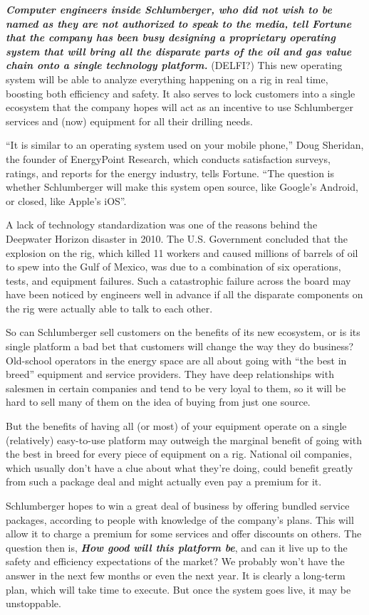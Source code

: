 \documentclass[12pt,a4paper]{article}
\begin{document}
\textbf{\emph{Computer engineers inside Schlumberger, who did not wish to be
    named as they are not authorized to speak to the media, tell Fortune
    that the company has been busy designing a proprietary operating system
    that will bring all the disparate parts of the oil and gas value chain
    onto a single technology platform.}} (DELFI?) This new operating system
will be able to analyze everything happening on a rig in real time, boosting
both efficiency and safety. It also serves to lock customers into a single
ecosystem that the company hopes will act as an incentive to use
Schlumberger services and (now) equipment for all their drilling needs.

``It is similar to an operating system used on your mobile phone,'' Doug
Sheridan, the founder of EnergyPoint Research, which conducts satisfaction
surveys, ratings, and reports for the energy industry, tells Fortune. ``The
question is whether Schlumberger will make this system open source, like
Google's Android, or closed, like Apple's iOS''.

A lack of technology standardization was one of the reasons behind the
Deepwater Horizon disaster in 2010. The U.S. Government concluded that the
explosion on the rig, which killed 11 workers and caused millions of barrels
of oil to spew into the Gulf of Mexico, was due to a combination of six
operations, tests, and equipment failures. Such a catastrophic failure
across the board may have been noticed by engineers well in advance if all
the disparate components on the rig were actually able to talk to each
other.

So can Schlumberger sell customers on the benefits of its new ecosystem, or
is its single platform a bad bet that customers will change the way they do
business? Old-school operators in the energy space are all about going with
``the best in breed'' equipment and service providers. They have deep
relationships with salesmen in certain companies and tend to be very loyal
to them, so it will be hard to sell many of them on the idea of buying from
just one source.

But the benefits of having all (or most) of your equipment operate on a
single (relatively) easy-to-use platform may outweigh the marginal benefit
of going with the best in breed for every piece of equipment on a rig.
National oil companies, which usually don't have a clue about what they're
doing, could benefit greatly from such a package deal and might actually
even pay a premium for it.

Schlumberger hopes to win a great deal of business by offering bundled
service packages, according to people with knowledge of the company's plans.
This will allow it to charge a premium for some services and offer discounts
on others. The question then is, \textbf{\emph{How good will this platform
    be}}, and can it live up to the safety and efficiency expectations of
the market? We probably won't have the answer in the next few months or even
the next year. It is clearly a long-term plan, which will take time to
execute. But once the system goes live, it may be unstoppable.
\end{document}
